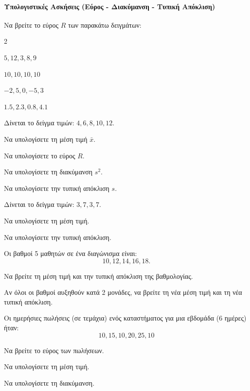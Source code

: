 \documentclass[11pt,a4paper,modern]{FFExercises}
\begin{document}
\paragraph{Υπολογιστικές Ασκήσεις (Εύρος - Διακύμανση - Τυπική Απόκλιση)}

\askhsh
Να βρείτε το εύρος $R$ των παρακάτω δειγμάτων:
\begin{multicols}{2}
\begin{alist}
    \item $5, 12, 3, 8, 9$
    \item $10, 10, 10, 10$
    \item $-2, 5, 0, -5, 3$
    \item $1.5, 2.3, 0.8, 4.1$
\end{alist}
\end{multicols}

\askhsh
Δίνεται το δείγμα τιμών: $4, 6, 8, 10, 12$.
\begin{alist}
    \item Να υπολογίσετε τη μέση τιμή $\bar{x}$.
    \item Να υπολογίσετε το εύρος $R$.
    \item Να υπολογίσετε τη διακύμανση $s^2$.
    \item Να υπολογίσετε την τυπική απόκλιση $s$.
\end{alist}

\askhsh
Δίνεται το δείγμα τιμών: $3, 7, 3, 7$.
\begin{alist}
    \item Να υπολογίσετε τη μέση τιμή.
    \item Να υπολογίσετε την τυπική απόκλιση.
\end{alist}

\askhsh
Οι βαθμοί 5 μαθητών σε ένα διαγώνισμα είναι: \[10, 12, 14, 16, 18.\]
\begin{alist}
    \item Να βρείτε τη μέση τιμή και την τυπική απόκλιση της βαθμολογίας.
    \item Αν όλοι οι βαθμοί αυξηθούν κατά 2 μονάδες, να βρείτε τη νέα μέση τιμή και τη νέα τυπική απόκλιση.
\end{alist}

\askhsh
Οι ημερήσιες πωλήσεις (σε τεμάχια) ενός καταστήματος για μια εβδομάδα (6 ημέρες) ήταν:
$$10, 15, 10, 20, 25, 10$$
\begin{alist}
    \item Να βρείτε το εύρος των πωλήσεων.
    \item Να υπολογίσετε τη μέση τιμή.
    \item Να υπολογίσετε τη διακύμανση.
\end{alist}
\end{document}
